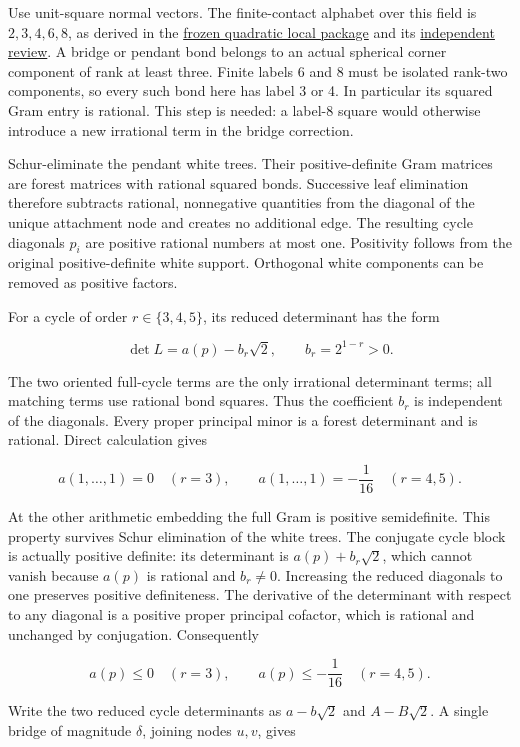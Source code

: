 \documentclass[
  10pt,
]{report}
\begin{document}
Use unit-square normal vectors. The finite-contact alphabet over this
field is \(2,3,4,6,8\), as derived in the
\href{fresh_arithmetic_sqrt2_local_20261015.md}{frozen quadratic local
package} and its
\href{fresh_arithmetic_sqrt2_local_20261015_review.md}{independent
review}. A bridge or pendant bond belongs to an actual spherical corner
component of rank at least three. Finite labels 6 and 8 must be isolated
rank-two components, so every such bond here has label 3 or 4. In
particular its squared Gram entry is rational. This step is needed: a
label-8 square would otherwise introduce a new irrational term in the
bridge correction.

Schur-eliminate the pendant white trees. Their positive-definite Gram
matrices are forest matrices with rational squared bonds. Successive
leaf elimination therefore subtracts rational, nonnegative quantities
from the diagonal of the unique attachment node and creates no
additional edge. The resulting cycle diagonals \(p_i\) are positive
rational numbers at most one. Positivity follows from the original
positive-definite white support. Orthogonal white components can be
removed as positive factors.

For a cycle of order \(r\in\{3,4,5\}\), its reduced determinant has the
form

\[
\det L=a(p)-b_r\sqrt2,
\qquad b_r=2^{1-r}>0.
\]

The two oriented full-cycle terms are the only irrational determinant
terms; all matching terms use rational bond squares. Thus the
coefficient \(b_r\) is independent of the diagonals. Every proper
principal minor is a forest determinant and is rational. Direct
calculation gives

\[
a(1,\ldots,1)=0\quad(r=3),
\qquad a(1,\ldots,1)=-\frac1{16}\quad(r=4,5).
\]

At the other arithmetic embedding the full Gram is positive
semidefinite. This property survives Schur elimination of the white
trees. The conjugate cycle block is actually positive definite: its
determinant is \(a(p)+b_r\sqrt2\), which cannot vanish because \(a(p)\)
is rational and \(b_r\ne0\). Increasing the reduced diagonals to one
preserves positive definiteness. The derivative of the determinant with
respect to any diagonal is a positive proper principal cofactor, which
is rational and unchanged by conjugation. Consequently

\[
a(p)\le0\quad(r=3),
\qquad a(p)\le-\frac1{16}\quad(r=4,5).
\]

Write the two reduced cycle determinants as \(a-b\sqrt2\) and
\(A-B\sqrt2\). A single bridge of magnitude \(\delta\), joining nodes
\(u,v\), gives
\end{document}
